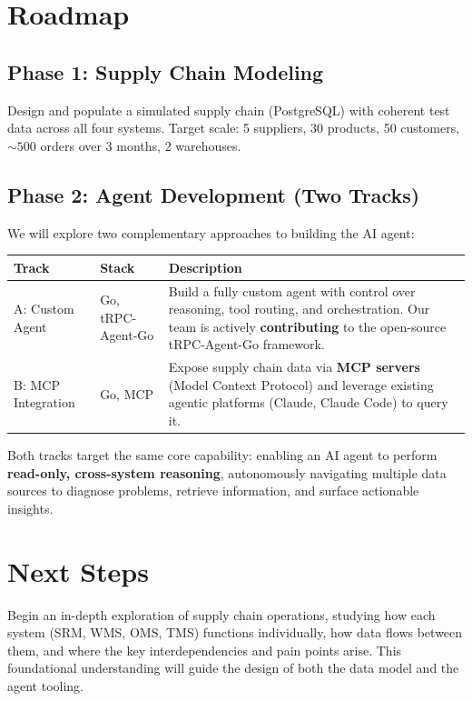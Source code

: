 \documentclass[11pt,a4paper]{article}
\begin{document}
\section{Roadmap}

\subsection{Phase 1: Supply Chain Modeling}

Design and populate a simulated supply chain (PostgreSQL) with coherent test data across all four systems. Target scale: 5 suppliers, 30 products, 50 customers, ${\sim}500$ orders over 3 months, 2 warehouses.

\subsection{Phase 2: Agent Development (Two Tracks)}

We will explore two complementary approaches to building the AI agent:

\begin{table}[h]
\centering\small
\begin{tabularx}{\textwidth}{@{}l l X@{}}
\toprule
\textbf{Track} & \textbf{Stack} & \textbf{Description} \\
\midrule
A: Custom Agent & Go, tRPC-Agent-Go &
    Build a fully custom agent with control over reasoning, tool routing, and orchestration. Our team is actively \textbf{contributing} to the open-source tRPC-Agent-Go framework. \\[0.6em]
B: MCP Integration & Go, MCP &
    Expose supply chain data via \textbf{MCP servers} (Model Context Protocol) and leverage existing agentic platforms (Claude, Claude Code) to query it. \\
\bottomrule
\end{tabularx}
\end{table}

\noindent Both tracks target the same core capability: enabling an AI agent to perform \textbf{read-only, cross-system reasoning}, autonomously navigating multiple data sources to diagnose problems, retrieve information, and surface actionable insights.

\section{Next Steps}

Begin an in-depth exploration of supply chain operations, studying how each system (SRM, WMS, OMS, TMS) functions individually, how data flows between them, and where the key interdependencies and pain points arise. This foundational understanding will guide the design of both the data model and the agent tooling.
\end{document}
